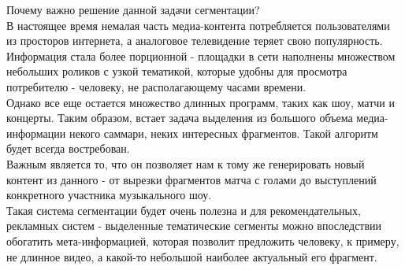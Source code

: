 \documentclass[../body.tex]{subfiles}
\begin{document}
	Почему важно решение данной задачи сегментации?\\ В настоящее время немалая часть медиа-контента потребляется пользователями из просторов интернета, а аналоговое телевидение теряет свою популярность. Информация стала более порционной - площадки в сети наполнены множеством небольших роликов с узкой тематикой, которые удобны для просмотра потребителю - человеку, не располагающему часами времени.\\
	Однако все еще остается множество длинных программ, таких как шоу, матчи и концерты. Таким образом, встает задача выделения из большого объема медиа-информации некого саммари, неких интересных фрагментов. Такой алгоритм будет всегда востребован.\\
	Важным является то, что он позволяет нам к тому же генерировать новый контент из данного - от вырезки фрагментов матча с голами до выступлений конкретного участника музыкального шоу.\\
	Такая система сегментации будет очень полезна и для рекомендательных, рекламных систем - выделенные тематические сегменты можно впоследствии обогатить мета-информацией, которая позволит предложить человеку, к примеру, не длинное видео, а какой-то небольшой наиболее актуальный его фрагмент.
	
\end{document}
